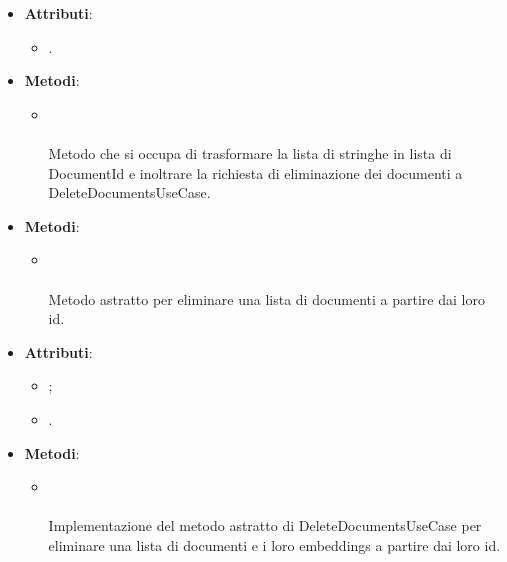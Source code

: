 \documentclass[10pt, a4paper]{article}
\begin{document}
\label{DeleteDocumentsControllerDettaglio}
\begin{itemize}
    \item \textbf{Attributi}:
    \begin{itemize}
        \item {}.
    \end{itemize}
    \item \textbf{Metodi}:
    \begin{itemize}
        \item {}\\ \\
        Metodo che si occupa di trasformare la lista di stringhe in lista di DocumentId e inoltrare la richiesta di eliminazione dei documenti a DeleteDocumentsUseCase.
    \end{itemize}
\end{itemize}

\label{DeleteDocumentsUseCaseDettaglio}
\begin{itemize}
    \item \textbf{Metodi}:
    \begin{itemize}
        \item {}\\ \\
        Metodo astratto per eliminare una lista di documenti a partire dai loro id.
    \end{itemize}
\end{itemize}

\label{DeleteDocumentsServiceDettaglio}
\begin{itemize}
    \item \textbf{Attributi}:
    \begin{itemize}
        \item {};
        \item {}. 
    \end{itemize}
    \item \textbf{Metodi}:
    \begin{itemize}
        \item {}\\ \\
        Implementazione del metodo astratto di DeleteDocumentsUseCase per eliminare una lista di documenti e i loro embeddings a partire dai loro id.
    \end{itemize}
\end{itemize}
\end{document}
